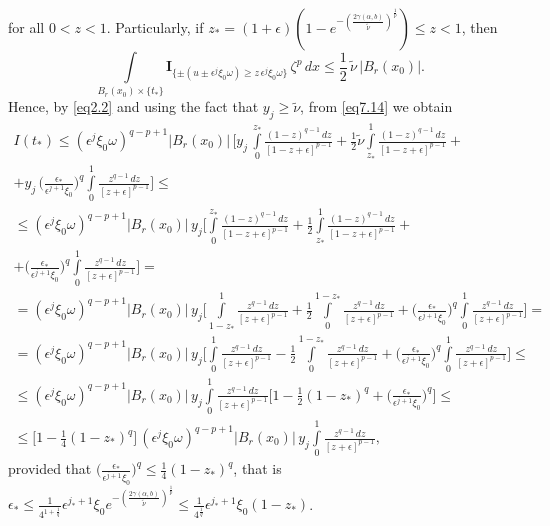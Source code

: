 \documentclass[a4paper,11pt,fullpage]{article}
\numberwithin{equation}{section}
\begin{document}
for all $0<z<1$. Particularly, if $z_*=(1+\epsilon)(1-e^{-(\frac{2\gamma(\alpha, b)}{\tilde{\nu}})^{\frac{1}{p}}})\leqslant z <1$, then
\begin{equation*}
\int\limits_{B_r(x_0)\times\{t_*\}}\mathbf{I}_{\{\pm(u\pm\epsilon^j\xi_0\omega)\geqslant z\,\epsilon^j\xi_0\omega \}}\,\zeta^p\,dx\leqslant \frac{1}{2}\,\tilde{\nu}\,|B_r(x_0)|.
\end{equation*}
Hence,  by \eqref{eq2.2} and using the fact that $y_j\geqslant \tilde{\nu}$, from \eqref{eq7.14} we obtain
\begin{multline}\label{eq7.15}
I(t_*)\leqslant(\epsilon^j\xi_0\omega)^{q-p+1}|B_r(x_0)|\,\bigg[y_j\,\int\limits^{z_*}_0\frac{(1-z)^{q-1}\,dz}{[1-z+\epsilon]^{p-1}}+
\frac{1}{2}\tilde{\nu}
\int\limits^{1}_{z_*}\frac{(1-z)^{q-1}\,dz}{[1-z+\epsilon]^{p-1}}+\\+
y_j\,\Big(\frac{\epsilon_*}{\epsilon^{j+1}\xi_0}\Big)^q
\int\limits^{1}_0\frac{z^{q-1}\,dz}{[z+\epsilon]^{p-1}}\bigg]\leqslant\\\leqslant (\epsilon^j\xi_0\omega)^{q-p+1}|B_r(x_0)|\,y_j\bigg[\int\limits^{z_*}_0\frac{(1-z)^{q-1}\,dz}{[1-z+\epsilon]^{p-1}}+\frac{1}{2}
\int\limits^{1}_{z_*}\frac{(1-z)^{q-1}\,dz}{[1-z+\epsilon]^{p-1}}+\\+
\Big(\frac{\epsilon_*}{\epsilon^{j+1}\xi_0}\Big)^q
\int\limits^{1}_0\frac{z^{q-1}\,dz}{[z+\epsilon]^{p-1}}\bigg]=\\=(\epsilon^j\xi_0\omega)^{q-p+1}|B_r(x_0)|\,y_j\bigg[
\int\limits^{1}_{1-z_*}\frac{z^{q-1}\,dz}{[z+\epsilon]^{p-1}}+\frac{1}{2}\int\limits^{1-z_*}_{0}\frac{z^{q-1}\,dz}{[z+\epsilon]^{p-1}}+
\Big(\frac{\epsilon_*}{\epsilon^{j+1}\xi_0}\Big)^q
\int\limits^{1}_0\frac{z^{q-1}\,dz}{[z+\epsilon]^{p-1}}\bigg]=\\=(\epsilon^j\xi_0\omega)^{q-p+1}|B_r(x_0)|\,y_j\bigg[
\int\limits^{1}_{0}\frac{z^{q-1}\,dz}{[z+\epsilon]^{p-1}}-\frac{1}{2}\int\limits^{1-z_*}_{0}\frac{z^{q-1}\,dz}{[z+\epsilon]^{p-1}}+
\Big(\frac{\epsilon_*}{\epsilon^{j+1}\xi_0}\Big)^q
\int\limits^{1}_0\frac{z^{q-1}\,dz}{[z+\epsilon]^{p-1}}\bigg]\leqslant \\\leqslant (\epsilon^j\xi_0\omega)^{q-p+1}|B_r(x_0)|\,y_j
\int\limits^{1}_0\frac{z^{q-1}\,dz}{[z+\epsilon]^{p-1}}\bigg[1-\frac{1}{2}(1-z_*)^q+
\Big(\frac{\epsilon_*}{\epsilon^{j+1}\xi_0}\Big)^q\bigg]\leqslant \\\leqslant \Big[1-\frac{1}{4}(1-z_*)^q\Big]\,(\epsilon^j\xi_0\omega)^{q-p+1}|B_r(x_0)|\,y_j
\int\limits^{1}_0\frac{z^{q-1}\,dz}{[z+\epsilon]^{p-1}},
\end{multline}
provided that $\big(\frac{\epsilon_*}{\epsilon^{j+1}\xi_0}\big)^q\leqslant \frac{1}{4}(1-z_*)^q$,
that is $\epsilon_*\leqslant \frac{1}{4^{1+\frac{1}{q}}}\epsilon^{j_*+1}\xi_0 e^{-(\frac{2\gamma(\alpha, b)}{\tilde{\nu}})^{\frac{1}{p}}}\leqslant \frac{1}{4^{\frac{1}{q}}}\epsilon^{j_*+1}\xi_0 (1-z_*)$.
\end{document}
